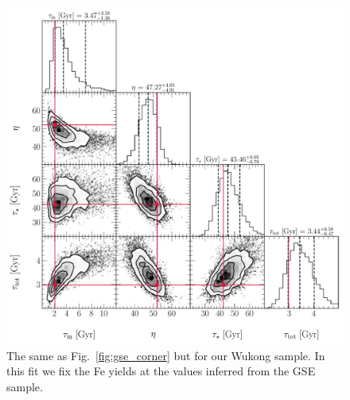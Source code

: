 \documentclass[ms.tex]{subfiles}
\begin{document}
\begin{figure}
\centering
\includegraphics[scale = 0.52]{wukong_expifr_102k4.pdf}
\caption{
The same as Fig.~\ref{fig:gse_corner} but for our Wukong sample.
In this fit we fix the Fe yields at the values inferred from the GSE sample.
}
\label{fig:wukong_corner}
\end{figure}
\end{document}
